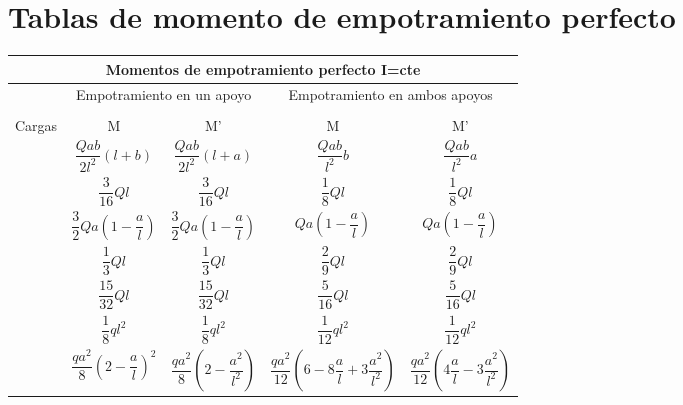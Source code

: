 
\clearpage
\section{Tablas de momento de empotramiento perfecto}

\begin{table}[H]
    \centering
    \resizebox{0.95\textwidth}{!}
    {
    \begin{tabular}{m{4cm}cccc}
         \multicolumn{5}{c}{\Large Momentos de empotramiento perfecto I=cte} \\ \toprule
         & \multicolumn{2}{c}{\large Empotramiento en un apoyo} & \multicolumn{2}{c}{\large Empotramiento en ambos apoyos} \\ \cmidrule{2-5} 
         &   &  & \multicolumn{2}{c}{} \\ \cmidrule{1-5}
        \multicolumn{1}{c}{\large{Cargas}} & \large{M} & \large{M'} & \large{M} & \large{M'} \\ \midrule
         & $\dfrac{Qab}{2l^2}(l+b)$ &  $\dfrac{Qab}{2l^2}(l+a)$ & $\dfrac{Qab}{l^2}b$ & $\dfrac{Qab}{l^2}a$ \\ \midrule
         & $\dfrac{3}{16}Ql$ & $\dfrac{3}{16}Ql$ & $\dfrac{1}{8}Ql$ & $\dfrac{1}{8}Ql$ \\ \midrule
         & $\dfrac{3}{2}Qa\left(1-\dfrac{a}{l}\right)$ & $\dfrac{3}{2}Qa\left(1-\dfrac{a}{l}\right)$ & $Qa\left(1-\dfrac{a}{l}\right)$ & $Qa\left(1-\dfrac{a}{l}\right)$ \\ \midrule
         & $\dfrac{1}{3}Ql$ & $\dfrac{1}{3}Ql$ & $\dfrac{2}{9}Ql$ & $\dfrac{2}{9}Ql$ \\ \midrule
         & $\dfrac{15}{32}Ql$ & $\dfrac{15}{32}Ql$ & $\dfrac{5}{16}Ql$ & $\dfrac{5}{16}Ql$ \\ \midrule
         & $\dfrac{1}{8}ql^2$ & $\dfrac{1}{8}ql^2$ & $\dfrac{1}{12}ql^2$ & $\dfrac{1}{12}ql^2$ \\ \midrule
         & $\dfrac{qa^2}{8}\left(2-\dfrac{a}{l}\right)^2$ & $\dfrac{qa^2}{8}\left(2-\dfrac{a^2}{l^2}\right)$ & $\dfrac{qa^2}{12}\left(6-8\dfrac{a}{l}+3\dfrac{a^2}{l^2}\right)$ & $\dfrac{qa^2}{12}\left(4\dfrac{a}{l}-3\dfrac{a^2}{l^2}\right)$ \\ \midrule

\end{tabular}}
\end{table}
